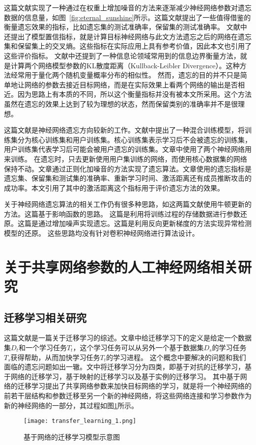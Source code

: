 这篇文献\cite{Golatkar_2020_CVPR}实现了一种通过在权重上增加噪音的方法来逐渐减少神经网络参数对遗忘数据的信息量，如图~\ref{fig:eternal_sunshine}所示。这篇文献提出了一些值得借鉴的衡量遗忘效果的指标，比如遗忘集的测试准确率，保留集的测试准确率。
文献中还提出了模型置信指标，就是计算目标神经网络与此文方法遗忘之后的网络在遗忘集和保留集上的交叉熵。这些指标在实际应用上具有参考价值，因此本文也引用了这些评价指标。
文献中还提到了一种信息论领域常用到的信息边界衡量方法，就是计算两个网络模型参数的KL散度距离（Kullback-Leibler Divergence）。这种方法经常用于量化两个随机变量概率分布的相似性。
然而，遗忘的目的并不只是简单地让网络的参数去接近目标网络，而是在实际效果上看两个网络的输出是否相近。因为思路上有本质的不同，所以这个衡量指标并没有被本文所采用。这个方法虽然在遗忘的效果上达到了较为理想的状态，然而保留类别的准确率并不是很理想。

这篇文献\cite{Golatkar_2021_CVPR}是神经网络遗忘方向较新的工作。文献中提出了一种混合训练模型，将训练集分为核心训练集和用户训练集。核心训练集表示学习后不会被遗忘的训练集，用户训练集代表学习后可能会被用户遗忘的训练集。文章中使用了两个神经网络用来训练。
在遗忘时，只去更新使用用户集训练的网络，而使用核心数据集的网络保持不动。文章通过正则化加噪音的方法实现了遗忘算法。文章使用的遗忘指标是遗忘集、保留集和测试集的准确率、重新学习时间、激活距离还有成员推断攻击的成功率。本文引用了其中的激活距离这个指标用于评价遗忘方法的效果。

关于神经网络遗忘算法的相关工作仍有很多种思路，如这两篇文献\cite{10.1007/978-3-030-58526-6_23,pmlr-v119-guo20c}使用牛顿更新的方法。这篇\cite{pmlr-v130-izzo21a}基于影响函数\cite{pmlr-v70-koh17a,cook_weisberg_1982}的思路。
这篇\cite{pmlr-v119-wu20b}是利用将训练过程的存储数据进行参数还原。这篇\cite{pmlr-v132-neel21a}是通过增加噪声实现遗忘。这篇\cite{10.1145/3319535.3363226}是利用反向更新梯度的方法实现异常检测模型的还原。
这些思路均没有针对卷积神经网络进行算法设计。


\section{关于共享网络参数的人工神经网络相关研究}

\subsection{迁移学习相关研究}

这篇文献\cite{10.1007/978-3-030-01424-7_27}是一篇关于迁移学习的综述。文章中给迁移学习下的定义是给定一个数据集$D_t$和一个学习任务$T_t$，这个学习任务可以从另外一个基于数据集$D_s$的学习任务$T_s$获得帮助，从而加快学习任务$T_t$的学习进程。
这个概念中要解决的问题和我们面临的遗忘问题如出一辙。文中将迁移学习分为四类，即基于对抗的迁移学习，基于网络的迁移学习，基于映射的迁移学习以及基于实例的迁移学习。
其中基于网络的迁移学习提出了共享网络参数来加快目标网络的学习，就是将一个神经网络的前若干层结构和参数迁移至另一个新的神经网络，将这些网络连接和学习参数作为新的神经网络的一部分，其过程如图\ref{fig:transfer_learning_1}所示。
\begin{figure}
    \centering
    \texttt{[image: transfer\_learning\_1.png]}
    \caption{基于网络的迁移学习模型示意图\cite{10.1007/978-3-030-01424-7_27}}
    \label{fig:transfer_learning_1}
\end{figure}

